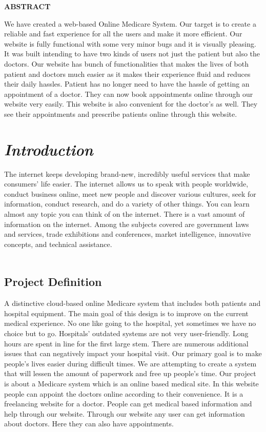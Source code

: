 \documentclass[14pt,a4paper,calibribody]{article}
\begin{document}
\begin{center}
\large{\textbf{ABSTRACT}}
\end{center}
We have created a web-based Online Medicare System. Our target is to create a reliable and fast experience for all the users and make it more efficient. Our website is fully functional with some very minor bugs and it is visually pleasing. It was built intending to have two kinds of users not just the patient but also the doctors. Our website has bunch of functionalities that makes the lives of both patient and doctors much easier as it makes their experience fluid and reduces their daily hassles. Patient has no longer need to have the hassle of getting an appointment of a doctor. They can now book appointments online through our website very easily. This website is also convenient for the doctor’s as well. They see their appointments and prescribe patients online through this website. 
\clearpage
\tableofcontents
\clearpage
\listoffigures
\clearpage
\section{\emph{\large{Introduction}}}
The internet keeps developing brand-new, incredibly useful services that make consumers' life easier. The internet allows us to speak with people worldwide, conduct business online, meet new people and discover various cultures, seek for information, conduct research, and do a variety of other things. You can learn almost any topic you can think of on the internet. There is a vast amount of information on the internet. Among the subjects covered are government laws and services, trade exhibitions and conferences, market intelligence, innovative concepts, and technical assistance.\\\\
\subsection{Project Definition}

A distinctive cloud-based online Medicare system that includes both patients and hospital equipment. The main goal of this design is to improve on the current medical experience. No one like going to the hospital, yet sometimes we have no choice but to go. Hospitals' outdated systems are not very user-friendly. Long hours are spent in line for the first large stem. There are numerous additional issues that can negatively impact your hospital visit. Our primary goal is to make people's lives easier during difficult times. We are attempting to create a system that will lessen the amount of paperwork and free up people's time. 
Our project is about a Medicare system which is an online based medical site. In this website people can appoint the doctors online according to their convenience. It is a freelancing website for a doctor. People can get medical based information and help through our website. Through our website any user can get information about doctors. Here they can also have appointments.\\\\
\end{document}
